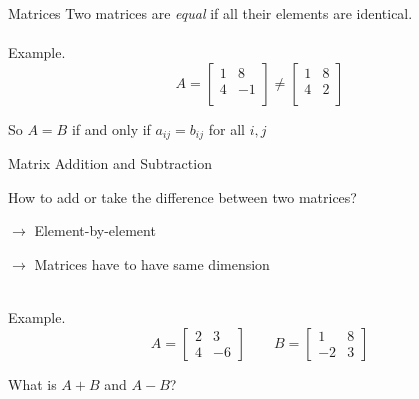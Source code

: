 \documentclass{./../../Latex/teaching_slides}
\begin{document}
\begin{frame}{Matrices}
Two matrices are \textit{equal} if all their elements are identical. \\~\\
Example.
$$A = \begin{bmatrix}
1 & 8  \\
4 &-1  \\
\end{bmatrix} \neq
 \begin{bmatrix}
1 & 8  \\
4 & 2  \\
\end{bmatrix}$$

\vspace{2em}
So $A=B$ if and only if $a_{ij} = b_{ij}$ for all $i, j$
\end{frame}

\begin{frame}{Matrix Addition and Subtraction}
\begin{witemize}
\item How to add or take the difference between two matrices? 
\item[] \hspace{1em} $\rightarrow$ Element-by-element
\item[] \hspace{1em} $\rightarrow$  Matrices have to have same dimension \\~\\
\end{witemize}
Example.
$$A = \begin{bmatrix}
2 & 3 \\
4 & -6 
 \end{bmatrix} \quad \quad
B = \begin{bmatrix}
1 & 8 \\
-2 & 3
\end{bmatrix}$$
\begin{witemize}
\item What is $A+B$ and $A-B$?
\end{witemize}
\end{frame}
\end{document}
